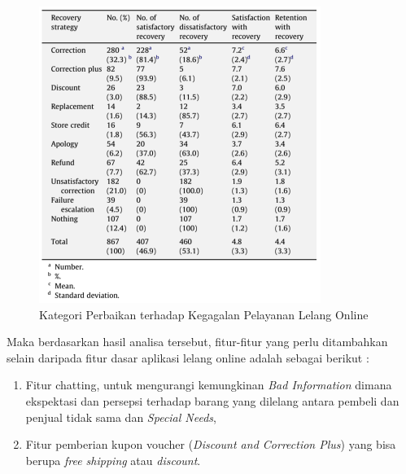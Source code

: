 	  \begin{figure}[H]
        \centering
        \includegraphics[width=\linewidth]{images/bab3/Solusi-Perbaikan-Ketidakpuasan.png}
        \caption{Kategori Perbaikan terhadap Kegagalan Pelayanan Lelang Online}
        \label{service-recovery-strategies}
      \end{figure}
      
      \indent Maka berdasarkan hasil analisa tersebut, fitur-fitur yang perlu ditambahkan selain daripada fitur dasar aplikasi lelang online adalah sebagai berikut :
      \begin{enumerate}
      \item Fitur chatting, untuk mengurangi kemungkinan \textit{Bad Information} dimana ekspektasi dan persepsi terhadap barang yang dilelang antara pembeli dan penjual tidak sama dan \textit{Special Needs}, 
      \item Fitur pemberian kupon voucher (\textit{Discount and Correction Plus}) yang bisa berupa \textit{free shipping} atau \textit{discount}.
      \end{enumerate}
  
 
